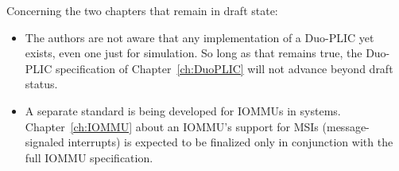 Concerning the two chapters that remain in draft state:
\begin{itemize}

\item
The authors are not aware that any implementation of
a Duo-PLIC yet exists, even one just for simulation.
So long as that remains true, the Duo-PLIC specification of
Chapter~\ref{ch:DuoPLIC} will not advance beyond draft status.

\item
A separate standard is being developed for IOMMUs in {\RISCV} systems.
Chapter~\ref{ch:IOMMU} about an IOMMU's support for MSIs
(message-signaled interrupts) is expected to be finalized
only in conjunction with the full {\RISCV} IOMMU specification.
\end{itemize}

